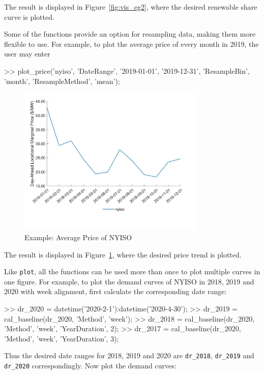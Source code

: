 \documentclass[11pt]{article}
\numberwithin{equation}{section}
\numberwithin{table}{section}
\numberwithin{figure}{section}
\begin{document}
The result is displayed in Figure~\ref{fig:vis_eg2}, where the desired renewable share curve is plotted.

Some of the functions provide an option for resampling data, making them more flexible to use. For example, to plot the average price of every month in 2019, the user may enter

\begin{Code}
  >> plot_price('nyiso', 'DateRange', {'2019-01-01', '2019-12-31'},
  'ResampleBin', 'month', 'ResampleMethod', 'mean');
\end{Code}

\begin{figure}
  \centering
  \noindent\includegraphics[width=0.8\textwidth]{figures/visualization_example3.jpg}
  \caption{Example: Average Price of NYISO} \label{fig:vis_eg3}
\end{figure}

The result is displayed in Figure~\ref{fig:vis_eg3}, where the desired price trend is plotted.

Like \verb!plot!, all the functions can be used more than once to plot multiple curves in one figure. For example, to plot the demand curves of NYISO in 2018, 2019 and 2020 with week alignment, first calculate the corresponding date range:

\begin{Code}
  >> dr_2020 = datetime('2020-2-1'):datetime('2020-4-30');
  >> dr_2019 = cal_baseline(dr_2020, 'Method', 'week');
  >> dr_2018 = cal_baseline(dr_2020, 'Method', 'week',
  'YearDuration', 2);
  >> dr_2017 = cal_baseline(dr_2020, 'Method', 'week',
  'YearDuration', 3);
\end{Code}

Thus the desired date ranges for 2018, 2019 and 2020 are \verb!dr_2018!, \verb!dr_2019! and \verb!dr_2020! correspondingly. Now plot the demand curves:
\end{document}
